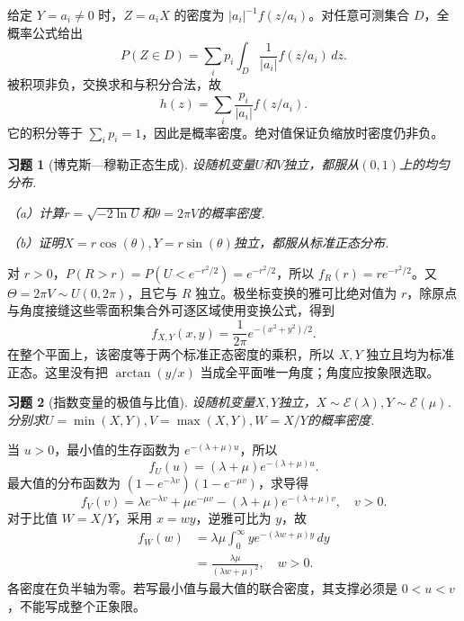 \documentclass[UTF8,12pt,a4paper,fontset=fandol]{ctexart}
\newtheorem{exercise}{习题}[section]
\begin{document}
\begin{solve}\label{a:Y4.22}给定 $Y=a_i\ne0$ 时，$Z=a_iX$ 的密度为 $|a_i|^{-1}f(z/a_i)$。对任意可测集合 $D$，全概率公式给出\[P(Z\in D)=\sum_i p_i\int_D\frac1{|a_i|}f(z/a_i)\,dz.\]被积项非负，交换求和与积分合法，故\[h(z)=\sum_i\frac{p_i}{|a_i|}f(z/a_i).\]它的积分等于 $\sum_i p_i=1$，因此是概率密度。绝对值保证负缩放时密度仍非负。\end{solve}

\begin{exercise}[博克斯—穆勒正态生成]\label{q:Y4.25}
设随机变量$U$和$V$独立，都服从$(0,1)$上的均匀分布.

（a）计算$r=\sqrt{-2\ln U}$和$\theta=2\pi V$的概率密度.

（b）证明$X=r\cos(\theta),Y=r\sin(\theta)$独立，都服从标准正态分布.\par{}
\end{exercise}

\begin{solve}\label{a:Y4.25}对 $r>0$，$P(R>r)=P(U<e^{-r^2/2})=e^{-r^2/2}$，所以 $f_R(r)=re^{-r^2/2}$。又 $\Theta=2\pi V\sim U(0,2\pi)$，且它与 $R$ 独立。极坐标变换的雅可比绝对值为 $r$，除原点与角度接缝这些零面积集合外可逐区域使用变换公式，得到\[f_{X,Y}(x,y)=\frac1{2\pi}e^{-(x^2+y^2)/2}.\]在整个平面上，该密度等于两个标准正态密度的乘积，所以 $X,Y$ 独立且均为标准正态。这里没有把 $\arctan(y/x)$ 当成全平面唯一角度；角度应按象限选取。\end{solve}

\begin{exercise}[指数变量的极值与比值]\label{q:Y4.30}
设随机变量$X,Y$独立，$X\sim \mathscr{E}(\lambda),Y\sim \mathscr{E}(\mu)$.分别求$U=\min (X,Y),V=\max(X,Y),W=X/Y$的概率密度.\par{}
\end{exercise}

\begin{solve}\label{a:Y4.30}当 $u>0$，最小值的生存函数为 $e^{-(\lambda+\mu)u}$，所以\[f_U(u)=(\lambda+\mu)e^{-(\lambda+\mu)u}.\]最大值的分布函数为 $(1-e^{-\lambda v})(1-e^{-\mu v})$，求导得\[f_V(v)=\lambda e^{-\lambda v}+\mu e^{-\mu v}-(\lambda+\mu)e^{-(\lambda+\mu)v},\quad v>0.\]对于比值 $W=X/Y$，采用 $x=wy$，逆雅可比为 $y$，故\[\begin{aligned}f_W(w)&=\lambda\mu\int_0^\infty ye^{-(\lambda w+\mu)y}\,dy\\&=\frac{\lambda\mu}{(\lambda w+\mu)^2},\quad w>0.\end{aligned}\]各密度在负半轴为零。若写最小值与最大值的联合密度，其支撑必须是 $0<u<v$，不能写成整个正象限。\end{solve}
\end{document}
